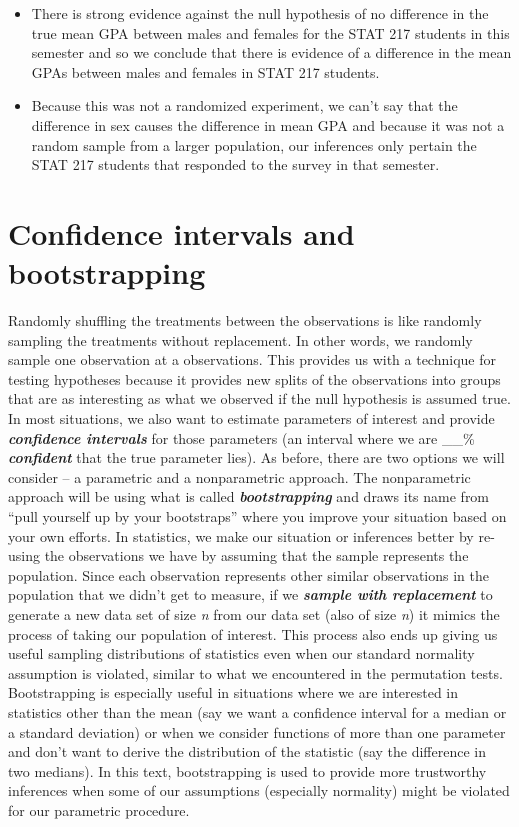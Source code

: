\documentclass[]{book}
\begin{document}
\begin{enumerate}
  \begin{itemize}
  \item
    There is strong evidence against the null hypothesis of no
    difference in the true mean GPA between males and females for the
    STAT 217 students in this semester and so we conclude that there is
    evidence of a difference in the mean GPAs between males and females
    in STAT 217 students.
  \item
    Because this was not a randomized experiment, we can't say that the
    difference in sex causes the difference in mean GPA and because it
    was not a random sample from a larger population, our inferences
    only pertain the STAT 217 students that responded to the survey in
    that semester.
  \end{itemize}
\end{enumerate}

\section{Confidence intervals and bootstrapping}\label{section2-8}

Randomly shuffling the treatments between the observations is like
randomly sampling the treatments without replacement. In other words, we
randomly sample one observation at a observations. This provides us with
a technique for testing hypotheses because it provides new splits of the
observations into groups that are as interesting as what we observed if
the null hypothesis is assumed true. In most situations, we also want to
estimate parameters of interest and provide \textbf{\emph{confidence
intervals}} for those parameters (an interval where we are \_\_\%
\textbf{\emph{confident}} that the true parameter lies). As before,
there are two options we will consider -- a parametric and a
nonparametric approach. The nonparametric approach will be using what is
called \textbf{\emph{bootstrapping}} and draws its name from ``pull
yourself up by your bootstraps'' where you improve your situation based
on your own efforts. In statistics, we make our situation or inferences
better by re-using the observations we have by assuming that the sample
represents the population. Since each observation represents other
similar observations in the population that we didn't get to measure, if
we \textbf{\emph{sample with replacement}} to generate a new data set of
size \emph{n} from our data set (also of size \emph{n}) it mimics the
process of taking our population of interest. This process also ends up
giving us useful sampling distributions of statistics even when our
standard normality assumption is violated, similar to what we
encountered in the permutation tests. Bootstrapping is especially useful
in situations where we are interested in statistics other than the mean
(say we want a confidence interval for a median or a standard deviation)
or when we consider functions of more than one parameter and don't want
to derive the distribution of the statistic (say the difference in two
medians). In this text, bootstrapping is used to provide more
trustworthy inferences when some of our assumptions (especially
normality) might be violated for our parametric procedure.
\end{document}
